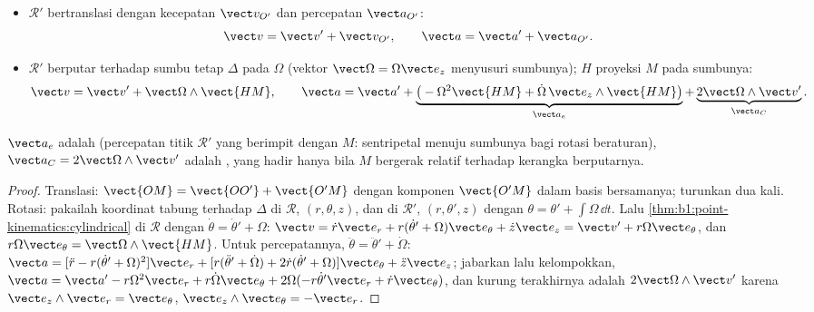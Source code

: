 \begin{theorem}\label{thm:b1:non-inertial-frames:composition}
\begin{itemize}
  \item $\mathcal R'$ bertranslasi dengan kecepatan $\vect v_{O'}$ dan
        percepatan $\vect a_{O'}$:
        \[
        \vect v = \vect v' + \vect v_{O'}, \qquad \vect a = \vect a' + \vect a_{O'} .
        \]
  \item $\mathcal R'$ berputar terhadap sumbu tetap $\Delta$ pada $\Omega$ (vektor
        $\vect\Omega = \Omega\vect e_z$ menyusuri sumbunya); $H$ proyeksi
        $M$ pada sumbunya:
        \[
        \vect v = \vect v' + \vect\Omega\wedge\vect{HM}, \qquad
        \vect a = \vect a' + \underbrace{\big(-\Omega^2\vect{HM} + \dot\Omega\,\vect e_z\wedge\vect{HM}\big)}_{\vect a_e}
        + \underbrace{2\vect\Omega\wedge\vect v'}_{\vect a_C} .
        \]
\end{itemize}
$\vect a_e$ adalah \emph{} (percepatan titik
$\mathcal R'$ yang berimpit dengan $M$: sentripetal menuju sumbunya
bagi rotasi beraturan), $\vect a_C = 2\vect\Omega\wedge\vect v'$ adalah
\emph{}, yang hadir hanya bila $M$ bergerak relatif terhadap
kerangka berputarnya.
\end{theorem}

\begin{proof}
Translasi: $\vect{OM} = \vect{OO'} + \vect{O'M}$ dengan komponen
$\vect{O'M}$ dalam basis bersamanya; turunkan dua kali. Rotasi: pakailah
koordinat tabung terhadap $\Delta$ di $\mathcal R$, $(r, \theta, z)$, dan
di $\mathcal R'$, $(r, \theta', z)$ dengan $\theta = \theta' + \int\Omega\,\dd t$.
Lalu \cref{thm:b1:point-kinematics:cylindrical} di $\mathcal R$ dengan
$\dot\theta = \dot\theta' + \Omega$:
$\vect v = \dot r\vect e_r + r(\dot\theta' + \Omega)\vect e_\theta + \dot z\vect e_z
= \vect v' + r\Omega\vect e_\theta$, dan $r\Omega\vect e_\theta = \vect\Omega\wedge\vect{HM}$.
Untuk percepatannya, $\ddot\theta = \ddot\theta' + \dot\Omega$:
$\vect a = [\ddot r - r(\dot\theta' + \Omega)^2]\vect e_r + [r(\ddot\theta' + \dot\Omega)
+ 2\dot r(\dot\theta' + \Omega)]\vect e_\theta + \ddot z\vect e_z$; jabarkan lalu
kelompokkan, $\vect a = \vect a' - r\Omega^2\vect e_r + r\dot\Omega\vect e_\theta
+ 2\Omega(-r\dot\theta'\vect e_r + \dot r\vect e_\theta)$, dan kurung terakhirnya adalah
$2\vect\Omega\wedge\vect v'$ karena $\vect e_z\wedge\vect e_r = \vect e_\theta$,
$\vect e_z\wedge\vect e_\theta = -\vect e_r$.
\end{proof}

